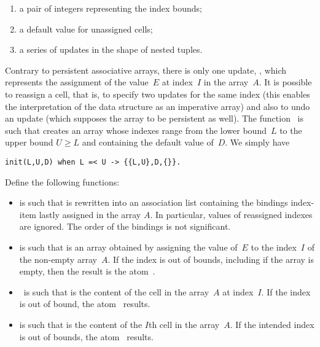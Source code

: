 \begin{enumerate}
\begin{enumerate}
      \item a pair of integers representing the index bounds;

      \item a default value for unassigned cells;

      \item a series of updates in the shape of nested tuples.

    \end{enumerate}
    Contrary to persistent associative arrays, there is only one
    update, , which represents the
    assignment of the value~\(E\) at index~\(I\) in the
    array~\(A\). It is possible to reassign a cell, that is, to
    specify two updates for the same index (this enables the
    interpretation of the data structure as an imperative array) and
    also to undo an update (which supposes the array to be persistent
    as well). The function~ is such that
     creates an array whose indexes
    range from the lower bound~\(L\) to the upper bound \(U \geqslant
    L\) and containing the default value of~\(D\). We simply have
\begin{verbatim}
init(L,U,D) when L =< U -> {{L,U},D,{}}.
\end{verbatim}
    Define the following functions:
    \begin{itemize}

      \item {} is such that  is
        rewritten into an association list containing the bindings
        index\hyp{}item lastly assigned in the array \(A\). In
        particular, values of reassigned indexes are ignored. The
        order of the bindings is not significant.

      \item {} is such that
         is an array obtained by
        assigning the value of~\(E\) to the index~\(I\) of the
        non\hyp{}empty array~\(A\). If the index is out of bounds,
        including if the array is empty, then the result is the
        atom~.

      \item {}~is such that  is
        the content of the cell in the array~\(A\) at index~\(I\). If
        the index is out of bound, the atom~ results.

      \item {} is such that  is
        the content of the \(I\)th cell in the array~\(A\). If the
        intended index is out of bounds, the atom~
        results.


\end{itemize}
\end{enumerate}
